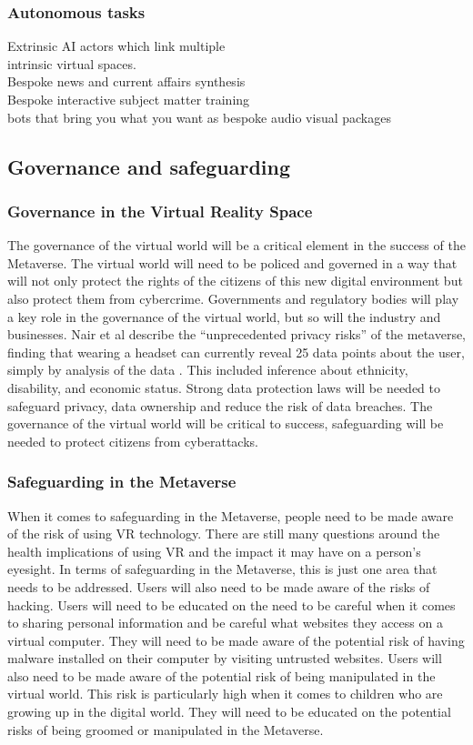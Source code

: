 \subsubsection{Autonomous tasks}

Extrinsic AI actors which link multiple\\ intrinsic virtual spaces.\\
Bespoke news and current affairs synthesis\\
Bespoke interactive subject matter training\\
bots that bring you what you want as bespoke audio visual packages
\subsection{Governance and safeguarding}
\subsubsection{Governance in the Virtual Reality Space}
The governance of the virtual world will be a critical element in the success of the Metaverse. The virtual world will need to be policed and governed in a way that will not only protect the rights of the citizens of this new digital environment but also protect them from cybercrime. Governments and regulatory bodies will play a key role in the governance of the virtual world, but so will the industry and businesses. Nair et al describe the ``unprecedented privacy risks'' of the metaverse, finding that wearing a headset can currently reveal 25 data points about the user, simply by analysis of the data \cite{nair2022exploring}. This included inference about ethnicity, disability, and economic status. Strong data protection laws will be needed to safeguard privacy, data ownership and reduce the risk of data breaches. The governance of the virtual world will be critical to success, safeguarding will be needed to protect citizens from cyberattacks.
\subsubsection{Safeguarding in the Metaverse}
When it comes to safeguarding in the Metaverse, people need to be made aware of the risk of using VR technology. There are still many questions around the health implications of using VR and the impact it may have on a person’s eyesight. In terms of safeguarding in the Metaverse, this is just one area that needs to be addressed. Users will also need to be made aware of the risks of hacking. Users will need to be educated on the need to be careful when it comes to sharing personal information and be careful what websites they access on a virtual computer. They will need to be made aware of the potential risk of having malware installed on their computer by visiting untrusted websites. Users will also need to be made aware of the potential risk of being manipulated in the virtual world. This risk is particularly high when it comes to children who are growing up in the digital world. They will need to be educated on the potential risks of being groomed or manipulated in the Metaverse.\\

